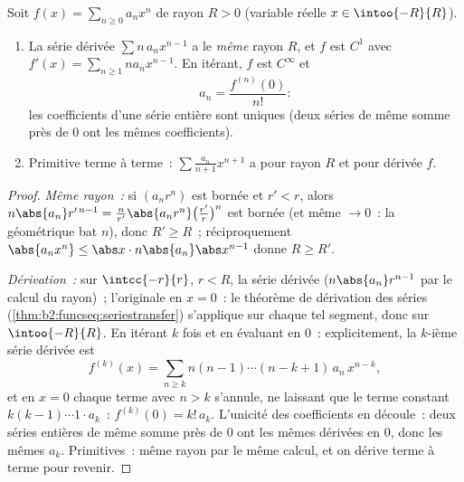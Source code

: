 \begin{theorem}\label{thm:b2:powerseries:calculus}
Soit $f(x) = \sum_{n\geq0} a_n x^n$ de rayon $R > 0$ (variable
réelle $x \in \intoo{-R}{R}$).
\begin{enumerate}
  \item La série dérivée $\sum n\,a_n x^{n-1}$ a le \emph{même}
        rayon $R$, et $f$ est $C^1$ avec $f'(x) = \sum_{n \geq 1}
        n a_n x^{n-1}$. En itérant, $f$ est $C^\infty$ et
        \[
        a_n = \frac{f^{(n)}(0)}{n!} :
        \]
        les coefficients d'une série entière sont uniques (deux
        séries de même somme près de $0$ ont les mêmes coefficients).
  \item Primitive terme à terme~: $\sum \frac{a_n}{n+1}x^{n+1}$ a
        pour rayon $R$ et pour dérivée $f$.
\end{enumerate}
\end{theorem}

\begin{proof}
\emph{Même rayon~:} si $(a_nr^n)$ est bornée et $r' < r$, alors
$n\abs{a_n} r'^{\,n-1} = \frac{n}{r'}\abs{a_nr^n}
\bigl(\frac{r'}{r}\bigr)^n$ est bornée (et même $\to 0$~: la
géométrique bat $n$), donc $R' \geq R$~; réciproquement $\abs{a_n x^n}
\leq \abs x \cdot n\abs{a_n}\abs x^{n-1}$ donne $R \geq R'$.

\emph{Dérivation~:} sur $\intcc{-r}{r}$, $r < R$, la série dérivée
  ($n\abs{a_n}r^{n-1}$  par le calcul
du rayon)~; l'originale  en $x = 0$~: le théorème de
dérivation des séries
(\cref{thm:b2:funcseq:seriestransfer}) s'applique sur chaque tel
segment, donc sur $\intoo{-R}{R}$. En itérant $k$ fois et
en évaluant en $0$~: explicitement, la $k$-ième série dérivée est
\[
f^{(k)}(x) = \sum_{n\geq k} n(n-1)\cdots(n-k+1)\,a_n\,x^{n-k},
\]
et en $x = 0$ chaque terme avec $n > k$ s'annule, ne laissant que
le terme constant $k(k-1)\cdots1\cdot a_k$~: $f^{(k)}(0) =
k!\,a_k$. L'unicité des coefficients en découle~: deux séries
entières de même somme près de $0$ ont les mêmes dérivées en $0$,
donc les mêmes $a_k$. Primitives~: même rayon par le même
calcul, et on dérive terme à terme pour revenir.
\end{proof}

